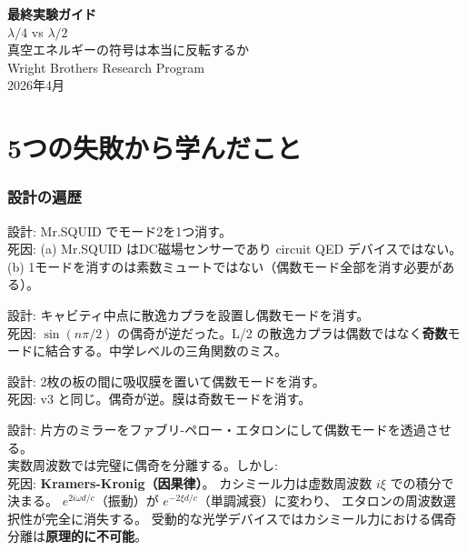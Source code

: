 \documentclass[12pt,a4paper]{article}
\begin{document}
\begin{center}
{\Huge\bfseries 最終実験ガイド}\\[0.5cm]
{\Large $\lambda/4$ vs $\lambda/2$}\\[0.2cm]
{\Large 真空エネルギーの符号は本当に反転するか}\\[1cm]
{\large Wright Brothers Research Program}\\[0.3cm]
{2026年4月}
\end{center}

\vspace{0.5cm}
\tableofcontents
\newpage

\part{5つの失敗から学んだこと}

\section{設計の遍歴}

\begin{deadbox}[v1-v2: SQUID（撤回）]
設計: Mr.SQUID でモード2を1つ消す。\\
死因: (a) Mr.SQUID はDC磁場センサーであり circuit QED デバイスではない。
(b) 1モードを消すのは素数ミュートではない（偶数モード全部を消す必要がある）。
\end{deadbox}

\begin{deadbox}
設計: キャビティ中点に散逸カプラを設置し偶数モードを消す。\\
死因: $\sin(n\pi/2)$ の偶奇が逆だった。L/2 の散逸カプラは偶数ではなく\textbf{奇数}モードに結合する。中学レベルの三角関数のミス。
\end{deadbox}

\begin{deadbox}
設計: 2枚の板の間に吸収膜を置いて偶数モードを消す。\\
死因: v3 と同じ。偶奇が逆。膜は奇数モードを消す。
\end{deadbox}

\begin{deadbox}
設計: 片方のミラーをファブリ-ペロー・エタロンにして偶数モードを透過させる。\\
実数周波数では完璧に偶奇を分離する。しかし:
\\
死因: \textbf{Kramers-Kronig（因果律）}。
カシミール力は虚数周波数 $i\xi$ での積分で決まる。
$e^{2i\omega d/c}$（振動）が $e^{-2\xi d/c}$（単調減衰）に変わり、
エタロンの周波数選択性が完全に消失する。
受動的な光学デバイスではカシミール力における偶奇分離は\textbf{原理的に不可能}。
\end{deadbox}
\end{document}
